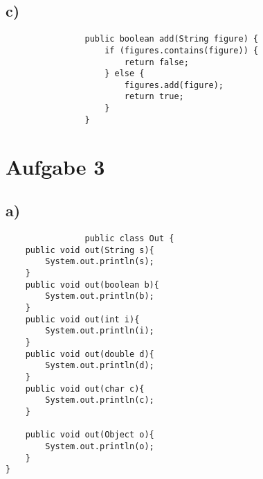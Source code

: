 \documentclass[12pt,a4paper,oneside,ngerman]{article}
\begin{document}
			\subsection{c)}
			\begin{verbatim}
				public boolean add(String figure) {
					if (figures.contains(figure)) {
						return false;
					} else {
						figures.add(figure);
						return true;
					}
				}
			\end{verbatim}
	\section{Aufgabe 3}
			\subsection{a)}
			\begin{verbatim}
				public class Out {
    public void out(String s){
        System.out.println(s);
    }
    public void out(boolean b){
        System.out.println(b);
    }
    public void out(int i){
        System.out.println(i);
    }
    public void out(double d){
        System.out.println(d);
    }
    public void out(char c){
        System.out.println(c);
    }

    public void out(Object o){
        System.out.println(o);
    }
}
			\end{verbatim}
\end{document}
